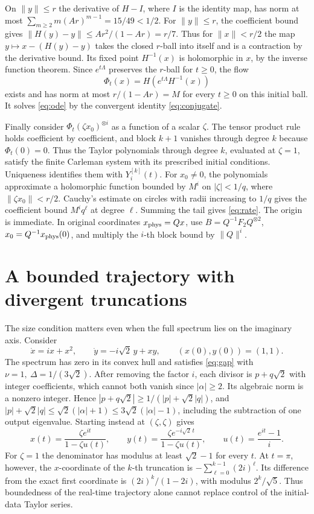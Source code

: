 \documentclass[11pt,a4paper]{article}
\begin{document}
On \(\|y\|\le r\) the derivative of \(H-I\), where \(I\) is the identity map, has norm at most
\(\sum_{m\ge2}m(Ar)^{m-1}=15/49<1/2\).
For \(\|y\|\le r\), the coefficient bound gives \(\|H(y)-y\|\le Ar^2/(1-Ar)=r/7\). Thus for \(\|x\|<r/2\) the map \(y\mapsto x-(H(y)-y)\) takes the closed \(r\)-ball into itself and is a contraction by the derivative bound. Its fixed point \(H^{-1}(x)\) is holomorphic in \(x\), by the inverse function theorem. Since \(e^{t\Lambda}\) preserves the \(r\)-ball for \(t\ge0\), the flow
\[
 \Phi_t(x)=H(e^{t\Lambda}H^{-1}(x))
\]
exists and has norm at most \(r/(1-Ar)=M\) for every \(t\ge0\) on this initial ball. It solves \eqref{eq:ode} by the convergent identity \eqref{eq:conjugate}.

Finally consider \(\Phi_t(\zeta x_0)^{\otimes i}\) as a function of a scalar \(\zeta\). The tensor product rule holds coefficient by coefficient, and block \(k+1\) vanishes through degree \(k\) because \(\Phi_t(0)=0\). Thus the Taylor polynomials through degree \(k\), evaluated at \(\zeta=1\), satisfy the finite Carleman system with its prescribed initial conditions. Uniqueness identifies them with \(Y_i^{[k]}(t)\). For \(x_0\ne0\), the polynomials approximate a holomorphic function bounded by \(M^i\) on \(|\zeta|<1/q\), where \(\|\zeta x_0\|<r/2\). Cauchy's estimate on circles with radii increasing to \(1/q\) gives the coefficient bound \(M^i q^\ell\) at degree \(\ell\). Summing the tail gives \eqref{eq:rate}. The origin is immediate. In original coordinates \(x_{\rm phys}=Qx\), use \(B=Q^{-1}F_2Q^{\otimes2}\), \(x_0=Q^{-1}x_{\rm phys}(0)\), and multiply the \(i\)-th block bound by \(\|Q\|^i\).

\section{A bounded trajectory with divergent truncations}
The size condition matters even when the full spectrum lies on the imaginary axis. Consider
\[
 \dot x=ix+x^2,\qquad \dot y=-i\sqrt2\,y+xy,\qquad (x(0),y(0))=(1,1).
\]
The spectrum has zero in its convex hull and satisfies \eqref{eq:gap} with \(\nu=1,\ \Delta=1/(3\sqrt2)\). After removing the factor \(i\), each divisor is \(p+q\sqrt2\) with integer coefficients, which cannot both vanish since \(|\alpha|\ge2\). Its algebraic norm is a nonzero integer. Hence \(|p+q\sqrt2|\ge1/(|p|+\sqrt2|q|)\), and
\(|p|+\sqrt2|q|\le\sqrt2(|\alpha|+1)\le3\sqrt2(|\alpha|-1)\), including the subtraction of one output eigenvalue.
Starting instead at \((\zeta,\zeta)\) gives
\[
 x(t)=\frac{\zeta e^{it}}{1-\zeta u(t)},\qquad
 y(t)=\frac{\zeta e^{-i\sqrt2\,t}}{1-\zeta u(t)},\qquad
 u(t)=\frac{e^{it}-1}{i}.
\]
For \(\zeta=1\) the denominator has modulus at least \(\sqrt2-1\) for every \(t\). At \(t=\pi\), however, the \(x\)-coordinate of the \(k\)-th truncation is
\(-\sum_{\ell=0}^{k-1}(2i)^\ell\). Its difference from the exact first coordinate is \((2i)^k/(1-2i)\), with modulus \(2^k/\sqrt5\). Thus boundedness of the real-time trajectory alone cannot replace control of the initial-data Taylor series.
\end{document}
